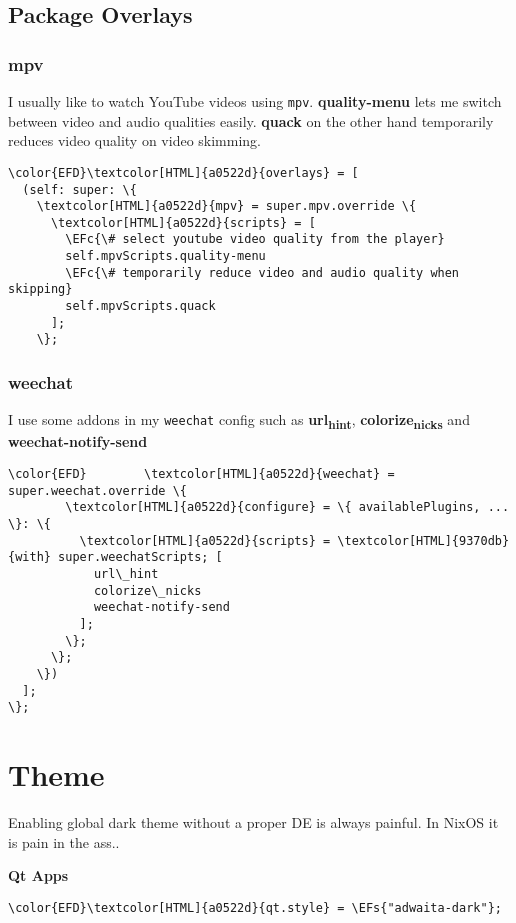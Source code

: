 \documentclass[14pt]{article}
\newcommand{\EFc}[1]{\textcolor{EFc}{#1}} %
\newcommand{\EFs}[1]{\textcolor{EFs}{#1}} %
\begin{document}
\subsection{Package Overlays}
\label{sec:orgf86de9a}
\subsubsection{mpv}
\label{sec:org673b9c2}
I usually like to watch YouTube videos using \texttt{mpv}. \textbf{quality-menu} lets me switch between video and audio qualities easily. \textbf{quack} on the other hand temporarily reduces video quality on video skimming.
\begin{Code}
\begin{Verbatim}
\color{EFD}\textcolor[HTML]{a0522d}{overlays} = [
  (self: super: \{
    \textcolor[HTML]{a0522d}{mpv} = super.mpv.override \{
      \textcolor[HTML]{a0522d}{scripts} = [
        \EFc{\# select youtube video quality from the player}
        self.mpvScripts.quality-menu
        \EFc{\# temporarily reduce video and audio quality when skipping}
        self.mpvScripts.quack
      ];
    \};
\end{Verbatim}
\end{Code}
\subsubsection{weechat}
\label{sec:org88ad885}
I use some addons in my \texttt{weechat} config such as \textbf{url\textsubscript{hint}}, \textbf{colorize\textsubscript{nicks}} and \textbf{weechat-notify-send}
\begin{Code}
\begin{Verbatim}
\color{EFD}        \textcolor[HTML]{a0522d}{weechat} = super.weechat.override \{
        \textcolor[HTML]{a0522d}{configure} = \{ availablePlugins, ... \}: \{
          \textcolor[HTML]{a0522d}{scripts} = \textcolor[HTML]{9370db}{with} super.weechatScripts; [
            url\_hint
            colorize\_nicks
            weechat-notify-send
          ];
        \};
      \};
    \})
  ];
\};
\end{Verbatim}
\end{Code}
\section{Theme}
\label{sec:org2be5419}
Enabling global dark theme without a proper DE is always painful. In NixOS it is pain in the ass..

\textbf{Qt Apps}
\begin{Code}
\begin{Verbatim}
\color{EFD}\textcolor[HTML]{a0522d}{qt.style} = \EFs{"adwaita-dark"};
\end{Verbatim}
\end{Code}
\end{document}
